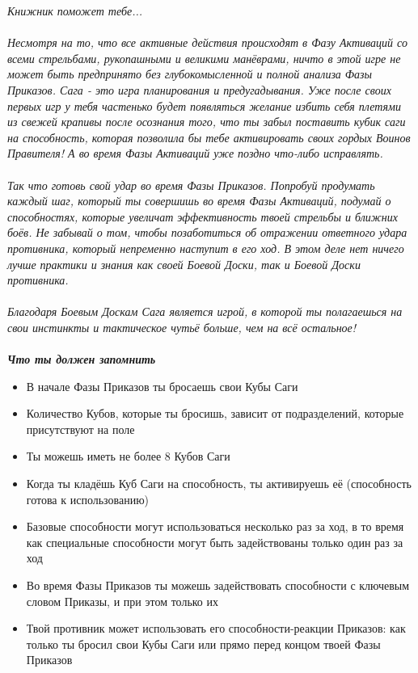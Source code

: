\documentclass[a4paper,11pt,twoside]{article}
\begin{document}
\begingroup
\fontsize{15pt}{11pt}\selectfont
\textit{Книжник поможет тебе...}\\ \\
\fontsize{11pt}{11pt}\selectfont
\textit{Несмотря на то, что все активные действия происходят в Фазу Активаций со всеми стрельбами, рукопашными и великими манёврами, ничто в этой игре не может быть предпринято без глубокомысленной и полной анализа Фазы Приказов. Сага - это игра планирования и предугадывания. Уже после своих первых игр у тебя частенько будет появляться желание избить себя плетями из свежей крапивы после осознания того, что ты забыл поставить кубик саги на способность, которая позволила бы тебе активировать своих гордых Воинов Правителя! А во время Фазы Активаций уже поздно что-либо исправлять. \\ \\
Так что готовь свой удар во время Фазы Приказов. Попробуй продумать каждый шаг, который ты совершишь во время Фазы Активаций, подумай о способностях, которые увеличат эффективность твоей стрельбы и ближних боёв. Не забывай о том, чтобы позаботиться об отражении ответного удара противника, который непременно наступит в его ход. В этом деле нет ничего лучше практики и знания как своей Боевой Доски, так и Боевой Доски противника. \\ \\ 
Благодаря Боевым Доскам Сага является игрой, в которой ты полагаешься на свои инстинкты и тактическое чутьё больше, чем на всё остальное!}
\endgroup 
\\ \\
\begingroup
\fontsize{15pt}{11pt}\selectfont
\textit{\textbf{Что ты должен запомнить}}\\ 
\fontsize{11pt}{11pt}\selectfont
\begin{itemize}
	\item В начале Фазы Приказов ты бросаешь свои Кубы Саги
	\item Количество Кубов, которые ты бросишь, зависит от подразделений, которые присутствуют на поле
	\item Ты можешь иметь не более 8 Кубов Саги
	\item Когда ты кладёшь Куб Саги на способность, ты активируешь её (способность готова к использованию)
	\item Базовые способности могут использоваться несколько раз за ход, в то время как специальные способности могут быть задействованы только один раз за ход
	\item Во время Фазы Приказов ты можешь задействовать способности с ключевым словом Приказы, и при этом только их
	\item Твой противник может использовать его способности-реакции Приказов: как только ты бросил свои Кубы Саги или прямо перед концом твоей Фазы Приказов
\end{itemize}
\endgroup 
\newpage
\end{document}
